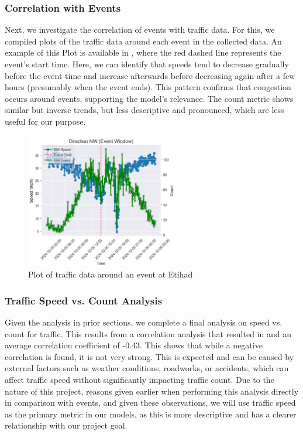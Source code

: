 \subsubsection{Correlation with Events}
Next, we investigate the correlation of events with traffic data. For this, we compiled plots of the traffic data around each event in the collected data. An example of this Plot is available in , where the red dashed line represents the event's start time. Here, we can identify that speeds tend to decrease gradually before the event time and increase afterwards before decreasing again after a few hours (presumably when the event ends). This pattern confirms that congestion occurs around events, supporting the model’s relevance. The count metric shows similar but inverse trends, but less descriptive and pronounced, which are less useful for our purpose.

\begin{figure}[!ht]
  \centering
  \includegraphics[width=0.6\textwidth]{images/design-implementation/traffic-event-corr.pdf}
  \caption{Plot of traffic data around an event at Etihad}
  \label{fig:traffic-event-corr}
\end{figure}

\subsubsection{Traffic Speed vs. Count Analysis}
Given the analysis in prior sections, we complete a final analysis on speed vs. count for traffic. This results from a correlation analysis that resulted in  and an average correlation coefficient of -0.43. This shows that while a negative correlation is found, it is not very strong. This is expected and can be caused by external factors such as weather conditions, roadworks, or accidents, which can affect traffic speed without significantly impacting traffic count. Due to the nature of this project, reasons given earlier when performing this analysis directly in comparison with events, and given these observations, we will use traffic speed as the primary metric in our models, as this is more descriptive and has a clearer relationship with our project goal.

